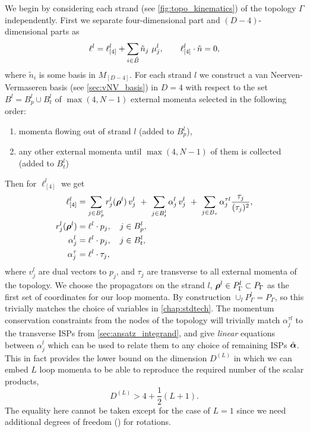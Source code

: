 We begin by considering each strand (see \cref{fig:topo_kinematics}) of the topology $\Gamma$ independently.
First we separate four-dimensional part and $(D-4)$-dimensional parts as
\begin{equation}
  \ell^l = \ell_{[4]}^l + \sum_{i\in \tilde{B}} \tilde{n}_j~\mu^l_{j}, \qquad \sp(\ell^l_{[4]},\tilde{n}) = 0, 
\end{equation}
where $\tilde{n}_i$ is some basis in $M_{[D-4]}$.
For each strand $l$ we construct a van Neerven-Vermaseren basis (see \cref{sec:vNV_basis})
in $D=4$ with respect to the set $B^l = B^l_p \cup B^l_t$ of $\max(4,N-1)$ external momenta selected in the following order:
\begin{enumerate}
  \item momenta flowing out of strand $l$ (added to $B^l_p$),
  \item any other external momenta until $\max(4,N-1)$ of them is collected (added to $B^l_t$)
\end{enumerate}
Then for $\ell^l_{[4]}$ we get
\begin{subequations}
  \label{eq:lparametrization}
  \begin{align}
    \ell^l_{[4]} &= \sum_{j\in B^l_p} r^l_j(\vb*{\rho}^l)\,v^l_j ~+~ \sum_{j\in B^l_t} \alpha^l_j\,v^l_j ~+~\sum_{j\in B_\tau} \alpha^{\tau l}_j \frac{\tau_j}{(\tau_j)^2}, \\
    \label{eq:lparametrization_b}
    r_j^l(\vb*{\rho}^l) &=  \sp(\ell^l, p_j), \quad j\in B^l_p,    \\ 
    \label{eq:lparametrization_c}
    \alpha_j^l &=  \sp(\ell^l, p_j),\quad j\in B^l_t, \\
    \label{eq:lparametrization_d}
    \alpha_j^\tau &=  \sp(\ell^l, \tau_j),
  \end{align}
\end{subequations}
where $v^l_j$ are dual vectors to $p_j$, and $\tau_j$ are transverse to all external momenta of the topology.
We choose the propagators on the strand $l$, $\vb*{\rho}^l \in P_\Gamma^l \subset P_\Gamma$
as the first set of coordinates for our loop momenta. By construction $\cup_l P_\Gamma^l = P_\Gamma$,
so this trivially matches the choice of variables in \cref{chap:stdtech}.
The momentum conservation constraints from the nodes of the topology will
trivially match $\alpha_j^{\tau l}$ to the transverse ISPs from \cref{sec:ansatz_integrand},
and give \emph{linear} equations between $\alpha_j^l$ which can be used to
relate them to any choice of remaining ISPs $\hat{\vb*{\alpha}}$.
This in fact provides the lower bound on the dimension $D^{(L)}$ in which we can embed $L$ loop momenta
to be able to reproduce the required number of the scalar products,
\begin{equation}
  D^{(L)}  >  4 +\frac{1}{2}(L+1).
\end{equation}
The equality here cannot be taken except for the case of $L=1$ since we need additional degrees of freedom
()
for rotations.

